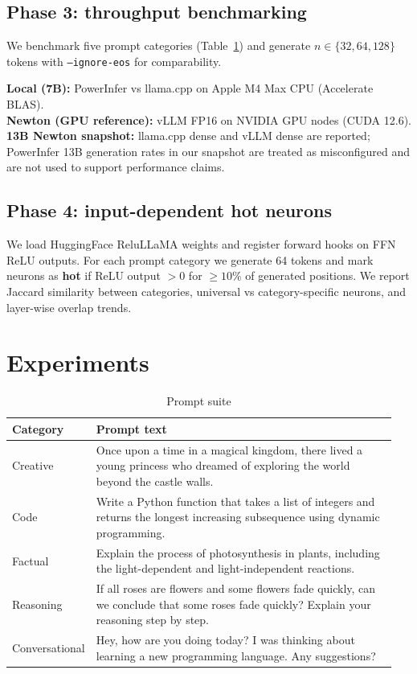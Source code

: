 \documentclass{article}
\begin{document}
\subsection{Phase 3: throughput benchmarking}
We benchmark five prompt categories (Table~\ref{tab:prompts}) and generate $n \in \{32, 64, 128\}$ tokens with \texttt{--ignore-eos} for comparability.

\noindent\textbf{Local (7B):} PowerInfer vs llama.cpp on Apple M4 Max CPU (Accelerate BLAS).\\
\textbf{Newton (GPU reference):} vLLM FP16 on NVIDIA GPU nodes (CUDA 12.6).\\
\textbf{13B Newton snapshot:} llama.cpp dense and vLLM dense are reported; PowerInfer 13B generation rates in our snapshot are treated as misconfigured and are not used to support performance claims.

\subsection{Phase 4: input-dependent hot neurons}
We load HuggingFace ReluLLaMA weights and register forward hooks on FFN ReLU outputs. For each prompt category we generate 64 tokens and mark neurons as \textbf{hot} if ReLU output $>0$ for $\geq 10\%$ of generated positions. We report Jaccard similarity between categories, universal vs category-specific neurons, and layer-wise overlap trends.

\section{Experiments}
\begin{table}[htbp]
  \centering
  \small
  \caption{Prompt suite}
  \label{tab:prompts}
  \begin{tabular}{@{}p{0.15\linewidth}p{0.8\linewidth}@{}}
    \toprule
    Category & Prompt text \\
    \midrule
    Creative & Once upon a time in a magical kingdom, there lived a young princess who dreamed of exploring the world beyond the castle walls. \\
    Code & Write a Python function that takes a list of integers and returns the longest increasing subsequence using dynamic programming. \\
    Factual & Explain the process of photosynthesis in plants, including the light-dependent and light-independent reactions. \\
    Reasoning & If all roses are flowers and some flowers fade quickly, can we conclude that some roses fade quickly? Explain your reasoning step by step. \\
    Conversational & Hey, how are you doing today? I was thinking about learning a new programming language. Any suggestions? \\
    \bottomrule
  \end{tabular}
\end{table}
\end{document}
